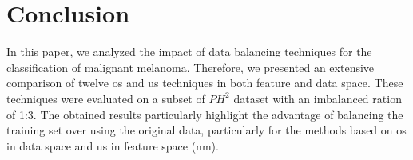 \graphicspath{ {./content/Experiments-results/figures/} }

\section{Conclusion}
\label{sec:cons} 

In this paper, we analyzed the impact of data balancing techniques for the classification of malignant melanoma. 
Therefore, we presented an extensive comparison of twelve \ac{os} and \ac{us} techniques in both feature and data space. 
These techniques were evaluated on a subset of $PH^{2}$ dataset with an imbalanced ration of 1:3. 
The obtained results particularly highlight the advantage of balancing the training set over using the original data, particularly for the methods based on \ac{os} in data space and \ac{us} in feature space (\ac{nm}).



